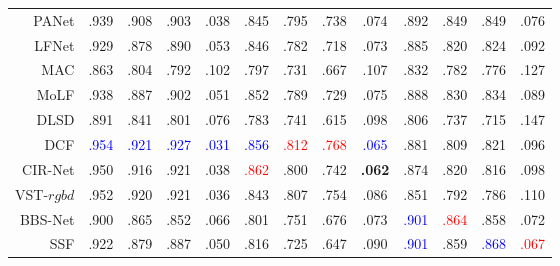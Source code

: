 \begin{table}[!ht]
{\begin{tabular}{rcccccccccccc}
			PANet \upcite{piao2021panet} 
			& .939 & .908 & .903 & .038 
			& .845 & .795 & .738 & .074 
			& .892 & .849 & .849 & .076
			\\
			
			LFNet	 \upcite{zhang2020lfnet} 
			& .929 & .878 & .890 & .053
			&	.846 &	.782 &	.718 &	.073 
			&	.885 &	.820 &	.824 &	.092 \\
			
			MAC	 \upcite{zhang2020light} 
			& .863	& .804	& .792	& .102	
			&   .797 & .731 & .667 & .107 
			& .832 & .782 & .776 & .127 \\
			
			MoLF	 \upcite{zhang2019memory} 
			& .938 & .887 & .902 & .051 
			&	.852 &	.789 &	.729 &	.075 
			&	.888 &	.830 &	.834 &	.089 \\
			
			DLSD	\upcite{piao2019deep}
			& .891	& .841	& .801	& .076	
			&   .783 & .741 & .615 & .098 
			& .806 & .737 & .715 & .147 \\
			
			\midrule[1pt] %
			
			
			DCF \upcite{ji2021calibrated} 
			& \textcolor{blue}{.954} & \textcolor{blue}{.921} & \textcolor{blue}{.927} & \textcolor{blue}{.031} 
			& \textcolor{blue}{.856} & {\textcolor{red}{.812}} & {\textcolor{red}{.768}} & \textcolor{blue}{.065} 
			& .881 & .809 & .821 & .096 \\
			
			CIR-Net \upcite{cong2022cir}
			& .950 & .916 & .921 & .038 
			& {\textcolor{red}{.862}} & .800  			& .742 & \textbf{ {.062}} 
			& .874 & .820 & .816 & .098 \\ 
			
			VST-$rgbd$  \upcite{liu2021visual} 
			& .952 & .920 & .921 & .036 
			& .843 & .807 & .754 & .086 
			& .851 & .792 & .786 & .110 
			\\
			
			
			BBS-Net     \upcite{fan2020bbs} 
			& .900 & .865 & .852 & .066 
			& .801 & .751 & .676 & .073 
			& \textcolor{blue}{.901} & {\textcolor{red}{.864}} & .858 & .072 \\ 
			
			SSF     \upcite{zhang2020select} 
			& .922 & .879 & .887 & .050 
			& .816 & .725 & .647 & .090 
			& \textcolor{blue}{.901} & .859 & \textcolor{blue}{.868} & {\textcolor{red}{.067}} \\ 
			

\end{tabular}}
\end{table}
